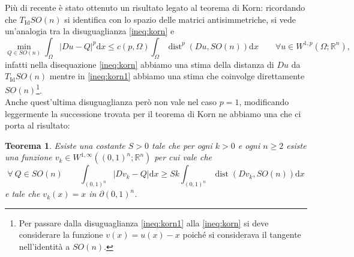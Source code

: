 \documentclass[a4paper,11pt]{book}
\theoremstyle{plain}
\newtheorem{teo}{Teorema}[chapter]
\theoremstyle{definition}
\theoremstyle{remark}
\newcommand{\R}{\mathbb{R}}
\newcommand{\dx}{\text{d}x}
\DeclareMathOperator{\Id}{Id}
\DeclareMathOperator{\dist}{dist}
\begin{document}
Più di recente è stato ottenuto un risultato legato al teorema di Korn: ricordando che $T_{\Id}SO(n)$ si identifica con lo spazio delle matrici antisimmetriche, si vede un'analogia tra la disuguaglianza \eqref{ineq:korn} e
\begin{equation}\label{ineq:korn1}
	\min_{Q\in SO(n)}\int_{\Omega}|Du-Q|^p\dx\leq c(p,\Omega)\int_{\Omega}\dist^p(Du,SO(n))\dx \qquad\forall u\in W^{1,p}(\Omega;\R^n),
\end{equation}
infatti nella disequazione \eqref{ineq:korn} abbiamo una stima della distanza di $Du$ da $T_{\Id}SO(n)$ mentre in \eqref{ineq:korn1} abbiamo una stima che coinvolge direttamente $SO(n)$\footnote{Per passare dalla disuguaglianza \eqref{ineq:korn1} alla \eqref{ineq:korn} si deve considerare la funzione $v(x) = u(x) - x$ poiché si considerava il tangente nell'identità a $SO(n)$.}.\\
Anche quest'ultima disuguaglianza però non vale nel caso $p=1$, modificando leggermente la successione trovata per il teorema di Korn ne abbiamo una che ci porta al risultato:
\begin{teo}
	Esiste una costante $S>0$ tale che per ogni $k>0$ e ogni $n\geq 2$ esiste una funzione $v_k\in W^{1,\infty}((0,1)^n;\R^n)$ per cui vale che
	\[
		\forall\  Q\in SO(n)\qquad\int_{(0,1)^n}|Dv_k-Q|\dx\geq Sk\int_{(0,1)^n}\dist(Dv_k,SO(n))\dx
	\] e tale che $v_k(x) = x$ in $\partial(0,1)^n$.
\end{teo}
\end{document}
